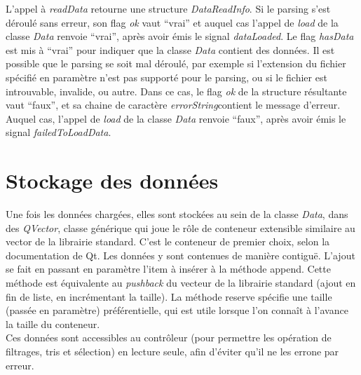 \documentclass[12pt]{article}
\begin{document}
		L’appel à \textit{readData} retourne une structure \textit{DataReadInfo}. Si le parsing s’est déroulé sans erreur, son flag \textit{ok} vaut “vrai” et auquel cas l’appel de \textit{load} de la classe \textit{Data} renvoie “vrai”, après avoir émis le signal \textit{dataLoaded}. Le flag \textit{hasData} est mis à “vrai” pour indiquer que la classe \textit{Data} contient des données. Il est possible que le parsing se soit mal déroulé, par exemple si l’extension du fichier spécifié en paramètre n’est pas supporté pour le parsing, ou si le fichier est introuvable, invalide, ou autre. Dans ce cas, le flag \textit{ok} de la structure résultante vaut “faux”, et sa chaine de caractère \textit{errorString}contient le message d’erreur. Auquel cas, l’appel de \textit{load} de la classe \textit{Data} renvoie “faux”, après avoir émis le signal \textit{failedToLoadData}.
	
	\section{Stockage des données}
	Une fois les données chargées, elles sont stockées au sein de la classe \textit{Data}, dans des \textit{QVector}, classe générique qui joue le rôle de conteneur extensible similaire au vector de la librairie standard. C’est le conteneur de premier choix, selon la documentation de Qt.
Les données y sont contenues de manière contiguë. L’ajout se fait en passant en paramètre l’item à insérer à la méthode append. Cette méthode est équivalente au \textit{pushback} du vecteur de la librairie standard (ajout en fin de liste, en incrémentant la taille). La méthode reserve spécifie une taille (passée en paramètre) préférentielle, qui est utile lorsque l’on connaît à l’avance la taille du conteneur.\\

	Ces données sont accessibles au contrôleur (pour permettre les opération de filtrages, tris et sélection) en lecture seule, afin d’éviter qu’il ne les errone par erreur.\\
\end{document}
